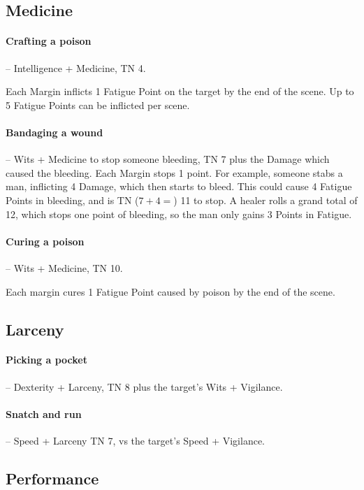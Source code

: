 \begin{multicols}{2}
\subsection{Medicine}

\paragraph{Crafting a poison} -- Intelligence + Medicine, TN 4.

Each Margin inflicts 1 Fatigue Point on the target by the end of the scene.
Up to 5 Fatigue Points can be inflicted per scene.

\paragraph{Bandaging a wound} -- Wits + Medicine to stop someone bleeding, TN 7 plus the Damage which caused the bleeding.
Each Margin stops 1 point.
For example, someone stabs a man, inflicting 4 Damage, which then starts to bleed.
This could cause 4 Fatigue Points in bleeding, and is TN ($7 + 4 = $) 11 to stop.
A healer rolls a grand total of 12, which stops one point of bleeding, so the man only gains 3 Points in Fatigue.

\paragraph{Curing a poison} -- Wits + Medicine, TN 10.

Each margin cures 1 Fatigue Point caused by poison by the end of the scene.

\subsection{Larceny}

\paragraph{Picking a pocket} -- Dexterity + Larceny, TN 8 plus the target's Wits + Vigilance.

\paragraph{Snatch and run} -- Speed + Larceny TN 7, vs the target's Speed + Vigilance.

\subsection{Performance}


\end{multicols}
